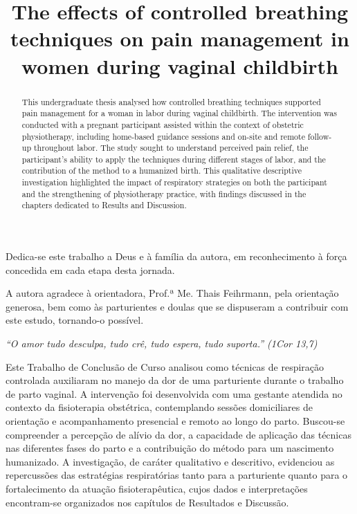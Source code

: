 \documentclass[openright]{normas-utf-tex}
\title{The effects of controlled breathing techniques on pain management in women during vaginal childbirth}
\begin{document}
\pdfstringdefDisableCommands{%
        \let\MakeUppercase\relax
}
\hypersetup{pageanchor=false}
\capa
\folhaderosto
{}

\begin{dedicatoria}
\vspace*{\fill}
Dedica-se este trabalho a Deus e à família da autora, em reconhecimento à força concedida em cada etapa desta jornada.\\[1ex]
\vspace*{\fill}
\end{dedicatoria}

\begin{agradecimentos}
A autora agradece à orientadora, Prof.ª Me. Thais Feihrmann, pela orientação generosa, bem como às parturientes e doulas que se dispuseram a contribuir com este estudo, tornando-o possível.
\end{agradecimentos}

\begin{epigrafe}
\begin{flushright}
\emph{``O amor tudo desculpa, tudo crê, tudo espera, tudo suporta.'' (1Cor 13,7)}
\end{flushright}
\end{epigrafe}

\begin{resumo}
Este Trabalho de Conclusão de Curso analisou como técnicas de respiração controlada auxiliaram no manejo da dor de uma parturiente durante o trabalho de parto vaginal. A intervenção foi desenvolvida com uma gestante atendida no contexto da fisioterapia obstétrica, contemplando sessões domiciliares de orientação e acompanhamento presencial e remoto ao longo do parto. Buscou-se compreender a percepção de alívio da dor, a capacidade de aplicação das técnicas nas diferentes fases do parto e a contribuição do método para um nascimento humanizado. A investigação, de caráter qualitativo e descritivo, evidenciou as repercussões das estratégias respiratórias tanto para a parturiente quanto para o fortalecimento da atuação fisioterapêutica, cujos dados e interpretações encontram-se organizados nos capítulos de Resultados e Discussão.
\end{resumo}

\begin{abstract}
This undergraduate thesis analysed how controlled breathing techniques supported pain management for a woman in labor during vaginal childbirth. The intervention was conducted with a pregnant participant assisted within the context of obstetric physiotherapy, including home-based guidance sessions and on-site and remote follow-up throughout labor. The study sought to understand perceived pain relief, the participant's ability to apply the techniques during different stages of labor, and the contribution of the method to a humanized birth. This qualitative descriptive investigation highlighted the impact of respiratory strategies on both the participant and the strengthening of physiotherapy practice, with findings discussed in the chapters dedicated to Results and Discussion.
\end{abstract}
\end{document}
